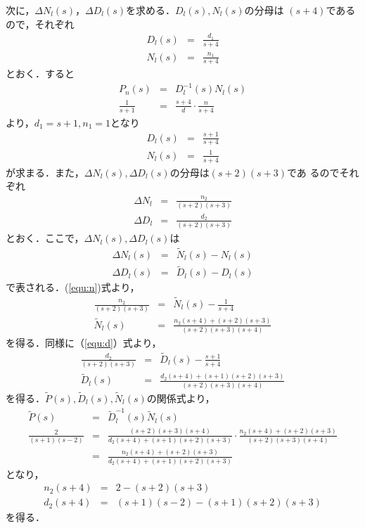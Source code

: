 \documentclass[a4paper,12pt]{jarticle}
\begin{document}
次に，$\Delta N_l(s)$，$\Delta D_l(s)$を求める．$D_l(s),N_l(s)$の分母は
$(s+4)$であるので，それぞれ
%
\begin{eqnarray}
 D_l(s)&=&\frac{d_1}{s+4} \\
 N_l(s)&=&\frac{n_1}{s+4}
\end{eqnarray}
%
とおく．すると
%
\begin{eqnarray}
 P_n(s) &=& D_l^{-1}(s)N_l(s) \\
 \frac{1}{s+1} &=& \frac{s+4}{d}\cdot \frac{n}{s+4} 
\end{eqnarray}
%
より，$d_1=s+1,n_1=1$となり
%
\begin{eqnarray}
 D_l(s) &=& \frac{s+1}{s+4} \\
 N_l(s) &=& \frac{1}{s+4}
\end{eqnarray}
%
が求まる．また，$\Delta N_l(s),\Delta D_l(s)$の分母は$(s+2)(s+3)$であ
るのでそれぞれ
%
\begin{eqnarray}
 \Delta N_l &=& \frac{n_2}{(s+2)(s+3)} \\
 \Delta D_l &=& \frac{d_2}{(s+2)(s+3)}
\end{eqnarray}
%
とおく．ここで，$\Delta N_l(s),\Delta D_l(s)$は
%
\begin{eqnarray}
 \Delta N_l(s) &=& \tilde{N}_l(s) -N_l(s) \label{equ:n} \\
 \Delta D_l(s) &=& \tilde{D}_l(s) -D_l(s) \label{equ:d}
\end{eqnarray}
%
で表される．(\ref{equ:n})式より，
%
\begin{eqnarray}
 \frac{n_2}{(s+2)(s+3)} &=& \tilde{N}_l(s) - \frac{1}{s+4} \nonumber \\
 \tilde{N}_l(s) &=& \frac{n_2(s+4)+(s+2)(s+3)}{(s+2)(s+3)(s+4)} 
\end{eqnarray}
%
を得る．同様に（\ref{equ:d}）式より，
%
\begin{eqnarray}
 \frac{d_2}{(s+2)(s+3)} &=& \tilde{D}_l(s) - \frac{s+1}{s+4} \nonumber \\
 \tilde{D}_l(s) &=& \frac{d_2(s+4)+(s+1)(s+2)(s+3)}{(s+2)(s+3)(s+4)} 
\end{eqnarray}
%
を得る．$\tilde{P}(s),\tilde{D}_l(s),\tilde{N}_l(s)$の関係式より，
%
\begin{eqnarray}
 \tilde{P}(s) &=& \tilde{D}_l^{-1}(s)\tilde{N}_l(s) \\
 \frac{2}{(s+1)(s-2)} &=&
  \frac{(s+2)(s+3)(s+4)}{d_2(s+4)+(s+1)(s+2)(s+3)} \cdot
  \frac{n_2(s+4)+(s+2)(s+3)}{(s+2)(s+3)(s+4)} \nonumber\\
 &=&\frac{n_2(s+4)+(s+2)(s+3)}{d_2(s+4)+(s+1)(s+2)(s+3)}
\end{eqnarray}
%
となり，
%
\begin{eqnarray}
 n_2 (s+4) &=& 2-(s+2)(s+3) \\
 d_2 (s+4) &=& (s+1)(s-2)-(s+1)(s+2)(s+3)
\end{eqnarray}
%
を得る．
\end{document}
